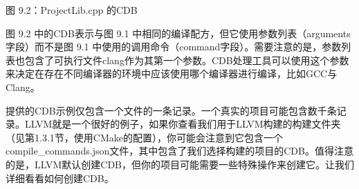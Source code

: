 \begin{center}
图 9.2：ProjectLib.cpp 的CDB
\end{center}

图 9.2 中的CDB表示与图 9.1 中相同的编译配方，但它使用参数列表（arguments字段）而不是图 9.1 中使用的调用命令（command字段）。需要注意的是，参数列表也包含了可执行文件clang作为其第一个参数。CDB处理工具可以使用这个参数来决定在存在不同编译器的环境中应该使用哪个编译器进行编译，比如GCC与Clang。

提供的CDB示例仅包含一个文件的一条记录。一个真实的项目可能包含数千条记录。LLVM就是一个很好的例子，如果你查看我们用于LLVM构建的构建文件夹（见第1.3.1节，使用CMake的配置），你可能会注意到它包含一个compile\_commands.json文件，其中包含了我们选择构建的项目的CDB。值得注意的是，LLVM默认创建CDB，但你的项目可能需要一些特殊操作来创建它。让我们详细看看如何创建CDB。
